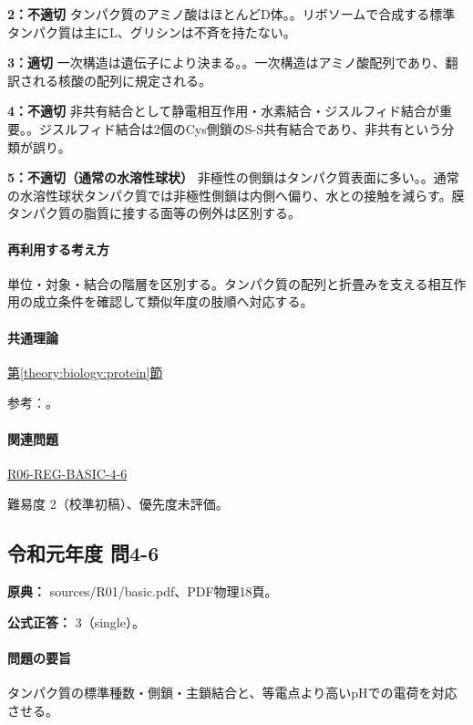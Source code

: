 \noindent\textbf{2：不適切} タンパク質のアミノ酸はほとんどD体。。リボソームで合成する標準タンパク質は主にL、グリシンは不斉を持たない。\par

\noindent\textbf{3：適切} 一次構造は遺伝子により決まる。。一次構造はアミノ酸配列であり、翻訳される核酸の配列に規定される。\par

\noindent\textbf{4：不適切} 非共有結合として静電相互作用・水素結合・ジスルフィド結合が重要。。ジスルフィド結合は2個のCys側鎖のS-S共有結合であり、非共有という分類が誤り。\par

\noindent\textbf{5：不適切（通常の水溶性球状）} 非極性の側鎖はタンパク質表面に多い。。通常の水溶性球状タンパク質では非極性側鎖は内側へ偏り、水との接触を減らす。膜タンパク質の脂質に接する面等の例外は区別する。\par

\paragraph{再利用する考え方} 単位・対象・結合の階層を区別する。タンパク質の配列と折畳みを支える相互作用の成立条件を確認して類似年度の肢順へ対応する。

\paragraph{共通理論} \hyperref[theory:biology:protein]{第\ref*{theory:biology:protein}節}

\par 参考：\cite{mit_protein}。

\paragraph{関連問題} \hyperref[q:r06-reg-basic-4-6]{R06-REG-BASIC-4-6}

\par 難易度 2（校準初稿）、優先度未評価。

\subsection{令和元年度 問4-6}
\label{q:r01-reg-basic-4-6}

\noindent\textbf{原典：} sources/R01/basic.pdf、PDF物理18頁。

\textbf{公式正答：} 3（single）。

\paragraph{問題の要旨} タンパク質の標準種数・側鎖・主鎖結合と、等電点より高いpHでの電荷を対応させる。

